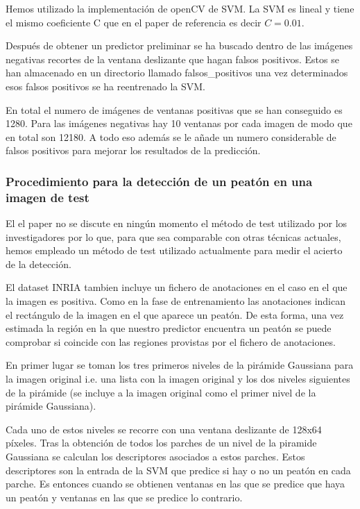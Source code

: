 \documentclass[a4paper,12pt]{article}
\begin{document}
Hemos utilizado la implementación de openCV de SVM. La SVM es
lineal y tiene el mismo coeficiente C que en el paper de referencia
es decir $C = 0.01$. 

Después de obtener un predictor preliminar se ha buscado dentro de las
imágenes negativas recortes de la ventana deslizante que hagan falsos
positivos. Estos se han almacenado en un directorio llamado falsos\_positivos
una vez determinados esos falsos positivos se ha reentrenado la SVM.

En total el numero de imágenes de ventanas positivas que se han
conseguido es 1280. Para las imágenes negativas hay 10 ventanas por
cada imagen de modo que en total son 12180. A todo eso además se le añade
un numero considerable de falsos positivos para mejorar los resultados
de la predicción.

\subsubsection{Procedimiento para la detección de un peatón en una imagen de test}

El el paper no se discute en ningún momento el método de test utilizado por los investigadores por lo que, para que sea comparable con otras técnicas actuales, hemos empleado un método de test utilizado actualmente para medir el acierto de la detección.

El dataset INRIA tambien incluye un fichero de anotaciones en el caso en el que la imagen es positiva. Como en la fase de entrenamiento las anotaciones indican el rectángulo de la imagen en el que aparece un peatón. De esta forma, una vez estimada la región en la que nuestro predictor encuentra un peatón se puede comprobar si coincide con las regiones provistas por el fichero de anotaciones. 

En primer lugar se toman los tres primeros niveles de la pirámide Gaussiana para la imagen original i.e. una lista con la imagen original y los dos niveles siguientes de la pirámide (se incluye a la imagen original como el primer nivel de la pirámide Gaussiana). 

Cada uno de estos niveles se recorre con una ventana deslizante de 128x64 píxeles. Tras la obtención de todos los parches de un nivel de la piramide Gaussiana se calculan los descriptores asociados a estos parches. Estos descriptores son la entrada de la SVM que predice si hay o no un peatón en cada parche. Es entonces cuando se obtienen ventanas en las que se predice que haya un peatón y ventanas en las que se predice lo contrario.
\end{document}
